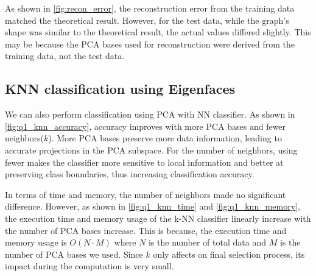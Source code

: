 As shown in \cref{fig:recon_error}, the reconstruction error from the training data matched the theoretical result. However, for the test data, while the graph’s shape was similar to the theoretical result, the actual values differed slightly. This may be because the PCA bases used for reconstruction were derived from the training data, not the test data.

\subsection{KNN classification using Eigenfaces}

We can also perform classification using PCA with NN classifier. As shown in \cref{fig:q1_knn_accuracy}, accuracy improves with more PCA bases and fewer neighbors($k$). More PCA bases preserve more data information, leading to accurate projections in the PCA subspace. For the number of neighbors, using fewer makes the classifier more sensitive to local information and better at preserving class boundaries, thus increasing classification accuracy.

In terms of time and memory, the number of neighbors made no significant difference. However, as shown in \cref{fig:q1_knn_time} and \cref{fig:q1_knn_memory}, the execution time and memory usage of the k-NN classifier linearly increase  with the number of PCA bases increase. This is because, the execution time and memory usage is $O(N\cdot M)$ where $N$ is the number of total data and $M$ is the number of PCA bases we used. Since $k$ only affects on final selection process, its impact during the computation is very small.

